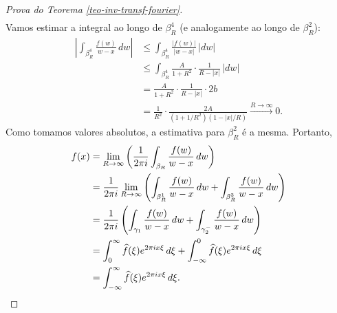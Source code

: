 \begin{proof}[Prova do Teorema \ref{teo-inv-transf-fourier}]
\begin{align*}
            \end{align*}
            Vamos estimar a integral ao longo de $\beta_R^4$ (e analogamente ao longo de $\beta_R^2$):
            \begin{align*}
                \left| \int_{\beta_R^4} \frac{f(w)}{w-x} \, dw \right| 
                &\leq \int_{\beta_R^4} \frac{|f(w)|}{|w-x|} \, |dw| \\
                &\leq \int_{\beta_R^4} \frac{A}{1+R^2}\cdot\frac{1}{R-|x|} \, |dw| \\
                &= \frac{A}{1+R^2}\cdot\frac{1}{R-|x|}\cdot 2b \\
                &= \frac{1}{R^2}\cdot\frac{2A}{(1+1/R^2)(1-|x|/R)} \xrightarrow{R\to\infty} 0.
            \end{align*}
            Como tomamos valores absolutos, a estimativa para $\beta_R^2$ é a mesma. Portanto,
            \begin{align*}
                f(x) &= \lim_{R\to\infty} \left( \frac{1}{2\pi i}\int_{\beta_R} \frac{f(w)}{w-x} \, dw \right) \\
                     &= \frac{1}{2\pi i} \lim_{R\to\infty} \left( \int_{\beta_R^1} \frac{f(w)}{w-x} \, dw 
                        + \int_{\beta_R^3} \frac{f(w)}{w-x} \, dw \right) \\
                     &= \frac{1}{2\pi i}\left( \int_{\gamma_1} \frac{f(w)}{w-x} \, dw 
                        + \int_{\gamma_2^-} \frac{f(w)}{w-x} \, dw \right) \\
                     &= \int_{0}^{\infty} \widehat{f}(\xi) e^{2\pi ix\xi} \, d\xi 
                        + \int_{-\infty}^0 \widehat{f}(\xi) e^{2\pi ix\xi} \, d\xi \\
                     &= \int_{-\infty}^{\infty} \widehat{f}(\xi) e^{2\pi ix\xi} \, d\xi.
            \end{align*}
        \end{proof}
        
